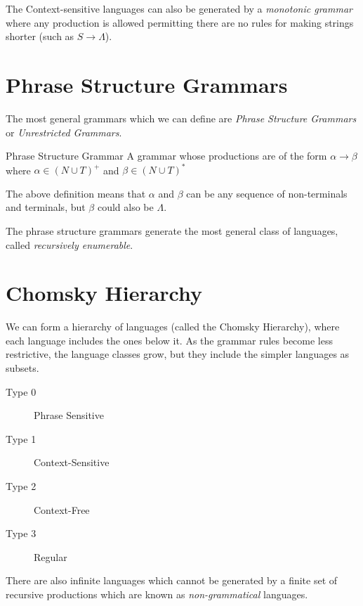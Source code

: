 The Context-sensitive languages can also be generated by a \textit{monotonic grammar} where any production is allowed permitting there are no rules for making strings shorter (such as $S \rightarrow \Lambda$). 

\section{Phrase Structure Grammars}
The most general grammars which we can define are \textit{Phrase Structure Grammars} or \textit{Unrestricted Grammars}.
\begin{define}
\item[Phrase Structure Grammar] A grammar whose productions are of the form $\alpha \rightarrow \beta$ where $\alpha \in (N \cup T)^+$ and $\beta \in (N \cup T)^*$
\end{define}

The above definition means that $\alpha$ and $\beta$ can be any sequence of non-terminals and terminals, but $\beta$ could also be $\Lambda$. 

The phrase structure grammars generate the most general class of languages, called \textit{recursively enumerable}. 

\section{Chomsky Hierarchy}
We can form a hierarchy of languages (called the Chomsky Hierarchy), where each language includes the ones below it. As the grammar rules become less restrictive, the language classes grow, but they include the simpler languages as subsets. 
\begin{description}
    \item[Type 0] Phrase Sensitive
    \item[Type 1] Context-Sensitive
    \item[Type 2] Context-Free
    \item[Type 3] Regular 
\end{description}

There are also infinite languages which cannot be generated by a finite set of recursive productions which are known as \textit{non-grammatical} languages.